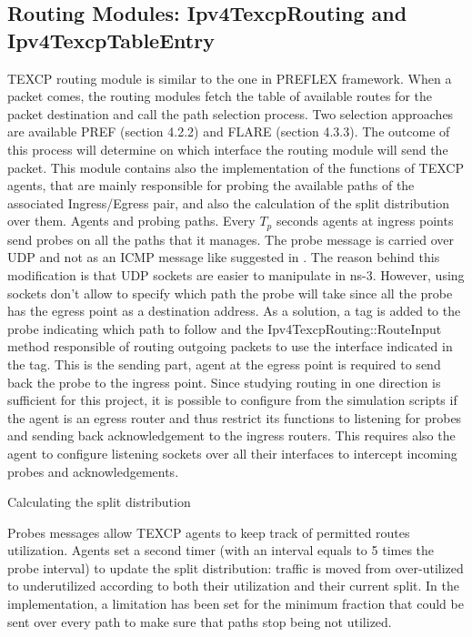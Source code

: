   		\subsection{Routing Modules: Ipv4TexcpRouting and Ipv4TexcpTableEntry}

TEXCP routing module is similar to the one in PREFLEX framework. When a packet comes, the routing modules fetch the table of available routes for the packet destination and call the path selection process. Two selection approaches are available PREF (section 4.2.2) and FLARE (section 4.3.3). The outcome of this process will determine on which interface the routing module will send the packet.  This module contains also the implementation of the functions of TEXCP agents, that are mainly responsible for probing the available paths of the associated Ingress/Egress pair, and also the calculation of the split distribution over them.
Agents and probing paths.
Every $T_p$ seconds agents at ingress points send probes on all the paths that it manages.  The probe message is carried over UDP and not as an ICMP message like suggested in \cite{kan1}. The reason behind this modification is that UDP sockets are easier to manipulate in ns-3. However, using sockets don't allow to specify which path the probe will take since all the probe has the egress point as a destination address. As a solution, a tag is added to the probe indicating which path to follow and the Ipv4TexcpRouting::RouteInput method responsible of routing outgoing packets to use the interface indicated in the tag. This is the sending part, agent at the egress point is required to send back the probe to the ingress point. Since studying routing in one direction is sufficient for this project, it is possible to configure from the simulation scripts if the agent is an egress router and thus restrict its functions to listening for probes and sending back acknowledgement to the ingress routers. This requires also the agent to configure listening sockets over all their interfaces to intercept incoming probes and acknowledgements.

Calculating the split distribution 

Probes messages allow TEXCP agents to keep  track of permitted routes utilization. Agents set a second timer (with an interval equals to 5 times the probe interval) to update the split distribution: traffic is moved from over-utilized to underutilized according to both their utilization and their current split. In the implementation, a limitation has been set for the minimum fraction that could be sent over every path to make sure that paths stop being not utilized.


